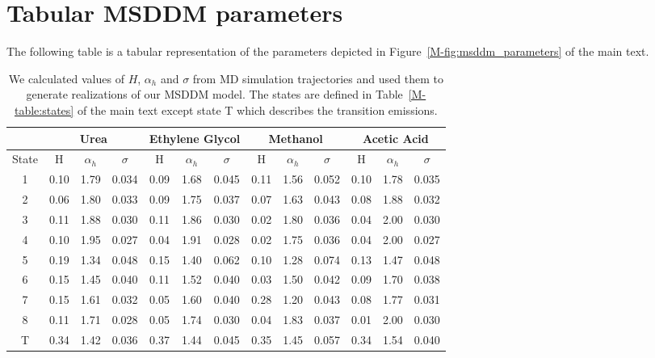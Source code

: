 \documentclass{article}
\begin{document}
  \newpage
  \section{Tabular MSDDM parameters}\label{section:msddm_params}
  
  The following table is a tabular representation of the parameters 
  depicted in Figure~\ref{M-fig:msddm_parameters} of the main text.
  
  \begin{table}[h]
  \centering
  \begin{tabular}{|c|c|c|c|c|c|c|c|c|c|c|c|c|}
  \hline
  & \multicolumn{3}{c|}{Urea} & \multicolumn{3}{c|}{Ethylene Glycol} & \multicolumn{3}{c|}{Methanol} & \multicolumn{3}{c|}{Acetic Acid} \\\hline
  State & H     &$\alpha_h$& $\sigma$ & H    &$\alpha_h$& $\sigma$   & H     &$\alpha_h$& $\sigma$ & H    &$\alpha_h$& $\sigma$ \\\hline
  1     & 0.10  & 1.79     & 0.034    & 0.09 & 1.68     & 0.045      & 0.11  & 1.56     & 0.052    & 0.10 & 1.78     & 0.035    \\
  2     & 0.06  & 1.80     & 0.033    & 0.09 & 1.75     & 0.037      & 0.07  & 1.63     & 0.043    & 0.08 & 1.88     & 0.032    \\
  3     & 0.11  & 1.88     & 0.030    & 0.11 & 1.86     & 0.030      & 0.02  & 1.80     & 0.036    & 0.04 & 2.00     & 0.030    \\
  4     & 0.10  & 1.95     & 0.027    & 0.04 & 1.91     & 0.028      & 0.02  & 1.75     & 0.036    & 0.04 & 2.00     & 0.027    \\
  5     & 0.19  & 1.34     & 0.048    & 0.15 & 1.40     & 0.062      & 0.10  & 1.28     & 0.074    & 0.13 & 1.47     & 0.048    \\
  6     & 0.15  & 1.45     & 0.040    & 0.11 & 1.52     & 0.040      & 0.03  & 1.50     & 0.042    & 0.09 & 1.70     & 0.038    \\
  7     & 0.15  & 1.61     & 0.032    & 0.05 & 1.60     & 0.040      & 0.28  & 1.20     & 0.043    & 0.08 & 1.77     & 0.031    \\
  8     & 0.11  & 1.71     & 0.028    & 0.05 & 1.74     & 0.030      & 0.04  & 1.83     & 0.037    & 0.01 & 2.00     & 0.030    \\
  T     & 0.34  & 1.42     & 0.036    & 0.37 & 1.44     & 0.045      & 0.35  & 1.45     & 0.057    & 0.34 & 1.54     & 0.040    \\\hline
  \end{tabular}
  \caption{We calculated values of $H$, $\alpha_h$ and $\sigma$ from MD simulation
  trajectories and used them to generate realizations of our MSDDM model. The states
  are defined in Table~\ref{M-table:states} of the main text except state T which describes the transition
  emissions.}\label{table:msddm_params}
  \end{table}  
  
\end{document}
